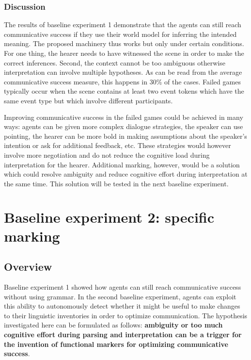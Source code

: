 \subsubsection{Discussion}
 The results of baseline experiment 1 demonstrate that the agents can still reach communicative success if they use their world model for inferring the intended meaning. The proposed machinery thus works but only under certain conditions. For one thing, the hearer needs to have witnessed the scene in order to make the correct inferences. Second, the context cannot be too ambiguous otherwise interpretation can involve multiple hypotheses. As can be read from the average communicative success measure, this happens in 30\% of the cases. Failed games typically occur when the scene contains at least two event tokens which have the same event type but which involve different participants.

\largerpage
Improving communicative success in the failed games could be achieved in many ways: agents can be given more complex dialogue strategies, the speaker can use pointing, the hearer can be more bold in making assumptions about the speaker's intention or ask for additional feedback, etc. These strategies would however involve more negotiation and do not reduce the cognitive load during interpretation for the hearer. Additional marking, however, would be a solution which could resolve ambiguity and reduce cognitive effort during interpretation at the same time. This solution will be tested in the next baseline experiment.

\section{Baseline experiment 2: specific marking}
\label{s:base2}

\subsection{Overview}
Baseline experiment 1 showed how agents can still reach communicative success without using grammar. In the second baseline experiment, agents can exploit this ability to autonomously detect whether it might be useful to make changes to their linguistic inventories in order to optimize communication. The hypothesis investigated here can be formulated as follows: {\bfseries ambiguity or too much cognitive effort during parsing and interpretation can be a trigger for the invention of functional markers for optimizing communicative success}.

